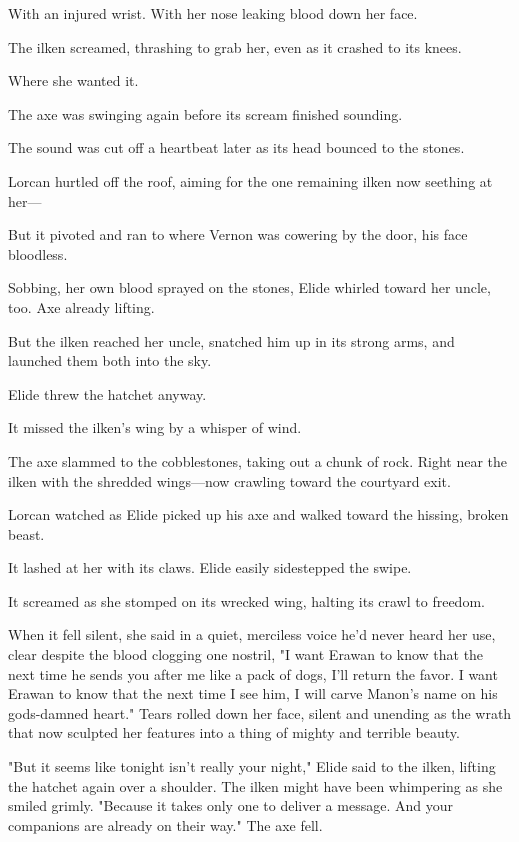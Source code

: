 With an injured wrist.
With her nose leaking blood down her face.

The ilken screamed, thrashing to grab her, even as it crashed to its knees.

Where she wanted it.

The axe was swinging again before its scream finished sounding.

The sound was cut off a heartbeat later as its head bounced to the stones.

Lorcan hurtled off the roof, aiming for the one remaining ilken now seething at her---

But it pivoted and ran to where Vernon was cowering by the door, his face bloodless.

Sobbing, her own blood sprayed on the stones, Elide whirled toward her uncle, too.
Axe already lifting.

But the ilken reached her uncle, snatched him up in its strong arms, and launched them both into the sky.

Elide threw the hatchet anyway.

It missed the ilken's wing by a whisper of wind.

The axe slammed to the cobblestones, taking out a chunk of rock.
Right near the ilken with the shredded wings---now crawling toward the courtyard exit.

Lorcan watched as Elide picked up his axe and walked toward the hissing, broken beast.

It lashed at her with its claws.
Elide easily sidestepped the swipe.

It screamed as she stomped on its wrecked wing, halting its crawl to freedom.

When it fell silent, she said in a quiet, merciless voice he'd never heard her use, clear despite the blood clogging one nostril, "I want Erawan to know that the next time he sends you after me like a pack of dogs, I'll return the favor.
I want Erawan to know that the next time I see him, I will carve Manon's name on his gods-damned heart."
Tears rolled down her face, silent and unending as the wrath that now sculpted her features into a thing of mighty and terrible beauty.

"But it seems like tonight isn't really your night," Elide said to the ilken, lifting the hatchet again over a shoulder.
The ilken might have been whimpering as she smiled grimly.
"Because it takes only one to deliver a message.
And your companions are already on their way."
The axe fell.

